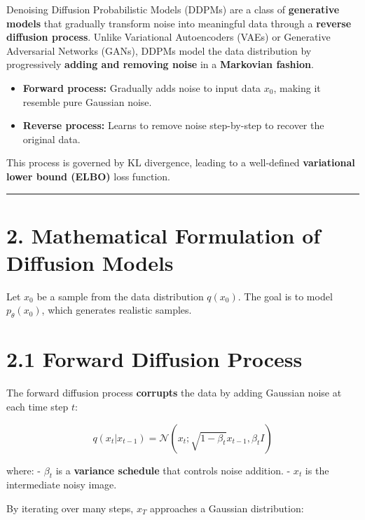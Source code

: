 \documentclass[
]{book}
\providecommand{\tightlist}{%
  \setlength{\itemsep}{0pt}\setlength{\parskip}{0pt}}
\begin{document}
Denoising Diffusion Probabilistic Models (DDPMs) are a class of \textbf{generative models} that gradually transform noise into meaningful data through a \textbf{reverse diffusion process}. Unlike Variational Autoencoders (VAEs) or Generative Adversarial Networks (GANs), DDPMs model the data distribution by progressively \textbf{adding and removing noise} in a \textbf{Markovian fashion}.

\begin{itemize}
\tightlist
\item
  \textbf{Forward process:} Gradually adds noise to input data \(x_0\), making it resemble pure Gaussian noise.
\item
  \textbf{Reverse process:} Learns to remove noise step-by-step to recover the original data.
\end{itemize}

This process is governed by KL divergence, leading to a well-defined \textbf{variational lower bound (ELBO)} loss function.

\begin{center}\rule{0.5\linewidth}{0.5pt}\end{center}

\section{2. Mathematical Formulation of Diffusion Models}\label{mathematical-formulation-of-diffusion-models}

Let \(x_0\) be a sample from the data distribution \(q(x_0)\). The goal is to model \(p_\theta(x_0)\), which generates realistic samples.

\section{\texorpdfstring{\textbf{2.1 Forward Diffusion Process}}{2.1 Forward Diffusion Process}}\label{forward-diffusion-process}

The forward diffusion process \textbf{corrupts} the data by adding Gaussian noise at each time step \(t\):

\[
q(x_t | x_{t-1}) = \mathcal{N}(x_t ; \sqrt{1 - \beta_t} x_{t-1}, \beta_t I)
\]

where:
- \(\beta_t\) is a \textbf{variance schedule} that controls noise addition.
- \(x_t\) is the intermediate noisy image.

By iterating over many steps, \(x_T\) approaches a Gaussian distribution:
\end{document}
